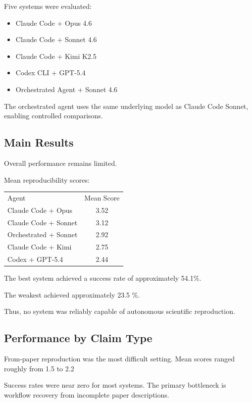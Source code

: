 \documentclass[11pt]{article}
\begin{document}
Five systems were evaluated:

\begin{itemize}
    \item Claude Code + Opus 4.6
    \item Claude Code + Sonnet 4.6
    \item Claude Code + Kimi K2.5
    \item Codex CLI + GPT-5.4
    \item Orchestrated Agent + Sonnet 4.6
\end{itemize}

The orchestrated agent uses the same underlying model as Claude Code Sonnet, enabling controlled comparisons.

\subsection*{Main Results}

Overall performance remains limited.

Mean reproducibility scores:

\begin{center}
\begin{tabular}{lc}
Agent & Mean Score \\
Claude Code + Opus & 3.52 \\
Claude Code + Sonnet & 3.12 \\
Orchestrated + Sonnet & 2.92 \\
Claude Code + Kimi & 2.75 \\
Codex + GPT-5.4 & 2.44
\end{tabular}
\end{center}

The best system achieved a success rate of approximately 54.1\%.

The weakest achieved approximately 23.5 \%.

Thus, no system was reliably capable of autonomous scientific reproduction.

\subsection*{Performance by Claim Type}

From-paper reproduction was the most difficult setting. Mean scores ranged roughly from 1.5 to 2.2

Success rates were near zero for most systems. The primary bottleneck is workflow recovery from incomplete paper descriptions.
\end{document}
